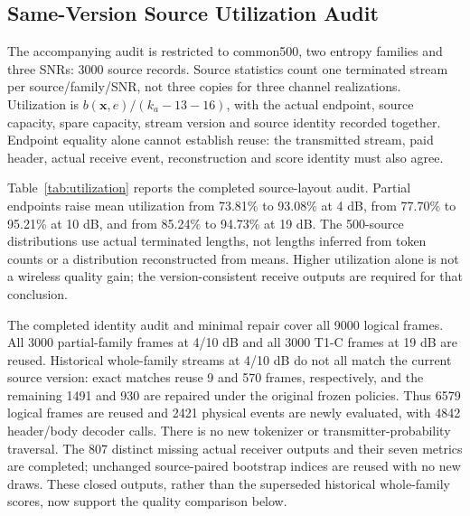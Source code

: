 \subsection{Same-Version Source Utilization Audit}
The accompanying audit is restricted to common500, two entropy families and three SNRs: 3000 source records. Source statistics count one terminated stream per source/family/SNR, not three copies for three channel realizations. Utilization is $b(\mathbf x,e)/(k_a-13-16)$, with the actual endpoint, source capacity, spare capacity, stream version and source identity recorded together. Endpoint equality alone cannot establish reuse: the transmitted stream, paid header, actual receive event, reconstruction and score identity must also agree.


Table~\ref{tab:utilization} reports the completed source-layout audit. Partial endpoints raise mean utilization from 73.81\% to 93.08\% at 4 dB, from 77.70\% to 95.21\% at 10 dB, and from 85.24\% to 94.73\% at 19 dB. The 500-source distributions use actual terminated lengths, not lengths inferred from token counts or a distribution reconstructed from means. Higher utilization alone is not a wireless quality gain; the version-consistent receive outputs are required for that conclusion.

The completed identity audit and minimal repair cover all 9000 logical frames. All 3000 partial-family frames at 4/10 dB and all 3000 T1-C frames at 19 dB are reused. Historical whole-family streams at 4/10 dB do not all match the current source version: exact matches reuse 9 and 570 frames, respectively, and the remaining 1491 and 930 are repaired under the original frozen policies. Thus 6579 logical frames are reused and 2421 physical events are newly evaluated, with 4842 header/body decoder calls. There is no new tokenizer or transmitter-probability traversal. The 807 distinct missing actual receiver outputs and their seven metrics are completed; unchanged source-paired bootstrap indices are reused with no new draws. These closed outputs, rather than the superseded historical whole-family scores, now support the quality comparison below.
